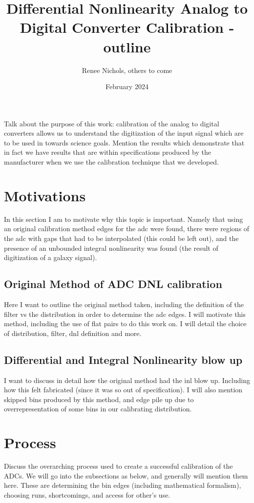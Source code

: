 \documentclass[11pt, letterpaper]{article}
\title{Differential Nonlinearity Analog to Digital Converter Calibration - outline}
\author{Renee Nichols, others to come}
\date{February 2024}
\begin{document}
\maketitle 

Talk about the purpose of this work: calibration of the analog to digital converters allows us to understand the digitization of the input signal which are to be used in towards science goals. Mention the results which demonstrate that in fact we have results that are within specifications produced by the manufacturer when we use the calibration technique that we developed. 

\section{Motivations}
In this section I am to motivate why this topic is important. Namely that using an original calibration method edges for the adc were found, there were regions of the adc with gaps that had to be interpolated (this could be left out), and the presence of an unbounded integral nonlinearity was found (the result of digitization of a galaxy signal). 

\subsection{Original Method of ADC DNL calibration}
Here I want to outline the original method taken, including the definition of the filter vs the distribution in order to determine the adc edges. I will motivate this method, including the use of flat pairs to do this work on. I will detail the choice of distribution, filter, dnl definition and more. 

\subsection{Differential and Integral Nonlinearity blow up}
I want to discuss in detail how the original method had the inl blow up. Including how this felt fabricated (since it was so out of specification). I will also mention skipped bins produced by this method, and edge pile up due to overrepresentation of some bins in our calibrating distribution.

\section{Process}
Discuss the overarching process used to create a successful calibration of the ADCs. We will go into the subsections as below, and generally will mention them here. These are determining the bin edges (including mathematical formalism), choosing runs, shortcomings, and access for other's use.
\end{document}
